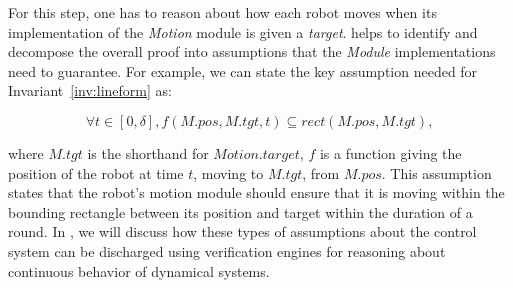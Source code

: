 For this step, one has to reason about how each robot  moves when its implementation of the \emph{Motion} module is given a \emph{target}.
\lgname helps to identify and decompose the overall proof into  assumptions that the \emph{Module} implementations need to guarantee. For example,  we can state the key assumption needed for Invariant~\ref{inv:lineform} as: 
\begin{assumption}
\label{lineform-assume}
\[
\forall t \in [0, \delta], f(M.pos, M.tgt, t) \subseteq rect(M.pos, M.tgt),
\]
\end{assumption}

where $M.tgt$ is the shorthand for $Motion.target$,
$f$ is a function giving the position of the robot at time $t$, moving to $M.tgt$, from $M.pos$.
This assumption states that the robot's motion module should ensure that it is moving within the bounding rectangle between its position and target within the duration of a round.
In , we will discuss how these types of assumptions about the control system can be discharged using verification engines for reasoning about continuous behavior of dynamical systems.

